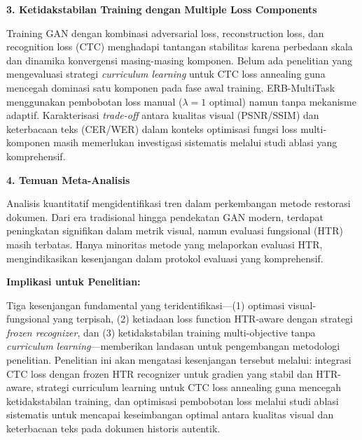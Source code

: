 \documentclass[12pt,a4paper]{book}
\begin{document}
\vspace{0.5em}
\noindent\textbf{3. Ketidakstabilan Training dengan Multiple Loss Components}

Training GAN dengan kombinasi adversarial loss, reconstruction loss, dan recognition loss (CTC) menghadapi tantangan stabilitas karena perbedaan skala dan dinamika konvergensi masing-masing komponen. Belum ada penelitian yang mengevaluasi strategi \textit{curriculum learning} untuk CTC loss annealing guna mencegah dominasi satu komponen pada fase awal training. ERB-MultiTask menggunakan pembobotan loss manual ($\lambda=1$ optimal) namun tanpa mekanisme adaptif. Karakterisasi \textit{trade-off} antara kualitas visual (PSNR/SSIM) dan keterbacaan teks (CER/WER) dalam konteks optimisasi fungsi loss multi-komponen masih memerlukan investigasi sistematis melalui studi ablasi yang komprehensif.

\vspace{0.5em}
\noindent\textbf{4. Temuan Meta-Analisis}

Analisis kuantitatif mengidentifikasi tren dalam perkembangan metode restorasi dokumen. Dari era tradisional hingga pendekatan GAN modern, terdapat peningkatan signifikan dalam metrik visual, namun evaluasi fungsional (HTR) masih terbatas. Hanya minoritas metode yang melaporkan evaluasi HTR, mengindikasikan kesenjangan dalam protokol evaluasi yang komprehensif.

\vspace{1ex}
\noindent\textbf{Implikasi untuk Penelitian:}

Tiga kesenjangan fundamental yang teridentifikasi—(1) optimasi visual-fungsional yang terpisah, (2) ketiadaan loss function HTR-aware dengan strategi \textit{frozen recognizer}, dan (3) ketidakstabilan training multi-objective tanpa \textit{curriculum learning}—memberikan landasan untuk pengembangan metodologi penelitian. Penelitian ini akan mengatasi kesenjangan tersebut melalui: integrasi CTC loss dengan frozen HTR recognizer untuk gradien yang stabil dan HTR-aware, strategi curriculum learning untuk CTC loss annealing guna mencegah ketidakstabilan training, dan optimisasi pembobotan loss melalui studi ablasi sistematis untuk mencapai keseimbangan optimal antara kualitas visual dan keterbacaan teks pada dokumen historis autentik.

\end{document}
